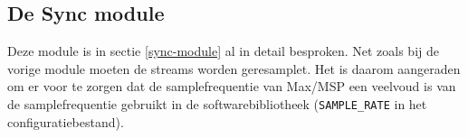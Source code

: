 \subsection*{De Sync module}

Deze module is in sectie \ref{sync-module} al in detail besproken. Net zoals bij de vorige module moeten de streams worden geresamplet. Het is daarom aangeraden om er voor te zorgen dat de samplefrequentie van Max/MSP een veelvoud is van de samplefrequentie gebruikt in de softwarebibliotheek (\texttt{SAMPLE\_RATE} in het configuratiebestand).